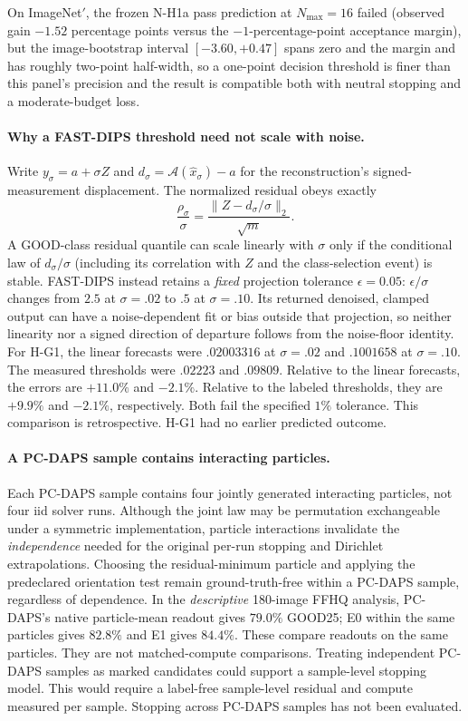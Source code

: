 On ImageNet$'$, the frozen
N-H1a pass prediction at $N_{\max}=16$ failed
(observed gain $-1.52$ percentage points versus the
$-1$-percentage-point acceptance margin), but the
image-bootstrap interval $[-3.60,+0.47]$
spans zero and the margin and has roughly
two-point half-width, so a one-point
decision threshold is finer than this
panel's precision and the result is compatible
both with neutral stopping and a moderate-budget
loss.

\paragraph{Why a FAST-DIPS threshold need not scale with noise.}
Write $y_\sigma=a+\sigma Z$ and
$d_\sigma=\mathcal A(\hat x_\sigma)-a$ for the
reconstruction's signed-measurement displacement.
The normalized residual obeys exactly
\[
 \frac{\rho_\sigma}{\sigma}=
 \frac{\|Z-d_\sigma/\sigma\|_2}{\sqrt m}.
\]
A GOOD-class residual quantile can scale linearly
with $\sigma$ only if the conditional law of
$d_\sigma/\sigma$ (including its correlation with
$Z$ and the class-selection event) is stable.
FAST-DIPS instead retains a \emph{fixed}
projection tolerance $\epsilon=0.05$:
$\epsilon/\sigma$ changes from $2.5$ at
$\sigma=.02$ to $.5$ at $\sigma=.10$.
Its returned denoised, clamped output can have
a noise-dependent fit or bias outside that
projection, so neither linearity nor a signed
direction of departure follows from the
noise-floor identity. For H-G1, the linear forecasts were
$.02003316$ at $\sigma=.02$ and $.1001658$ at $\sigma=.10$.
The measured thresholds were $.02223$ and $.09809$.
Relative to the linear forecasts, the errors are
$+11.0\%$ and $-2.1\%$. Relative to the labeled thresholds,
they are $+9.9\%$ and $-2.1\%$, respectively.
Both fail the specified $1\%$ tolerance.
This comparison is retrospective. H-G1 had no earlier
predicted outcome.

\paragraph{A PC-DAPS sample contains interacting particles.}
Each PC-DAPS sample contains four jointly generated interacting
particles, not four iid solver runs.
Although the joint law may be permutation
exchangeable under a symmetric implementation,
particle interactions invalidate the
\emph{independence} needed for the original
per-run stopping and Dirichlet extrapolations.
Choosing the residual-minimum particle and applying
the predeclared orientation test remain
ground-truth-free within a PC-DAPS sample, regardless of dependence.
In the \emph{descriptive}
180-image FFHQ analysis, PC-DAPS's native
particle-mean readout gives $79.0\%$ GOOD25;
E0 within the same particles gives $82.8\%$
and E1 gives $84.4\%$. These compare readouts on the same particles.
They are not matched-compute comparisons.
Treating independent PC-DAPS samples as marked candidates could
support a sample-level stopping model. This would require a
label-free sample-level residual and compute measured per sample.
Stopping across PC-DAPS samples has not been evaluated.

